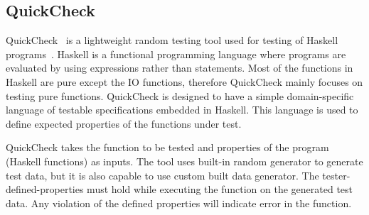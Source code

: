 \subsection{QuickCheck}
QuickCheck~\cite{claessen2011quickcheck} is a lightweight random testing tool used for testing of Haskell programs~\cite{hudak2007history}. Haskell is a functional programming language where programs are evaluated by using expressions rather than statements. Most of the functions in Haskell are pure except the IO functions, therefore QuickCheck mainly focuses on testing pure functions. QuickCheck is designed to have a simple domain-specific language of testable specifications embedded in Haskell. This language is used to define expected properties of the functions under test. %

QuickCheck takes the function to be tested and properties of the program (Haskell functions) as inputs. The tool uses built-in random generator to generate test data, but it is also capable to use custom built data generator. The tester-defined-properties must hold while executing the function on the generated test data. Any violation of the defined properties will indicate error in the function.







